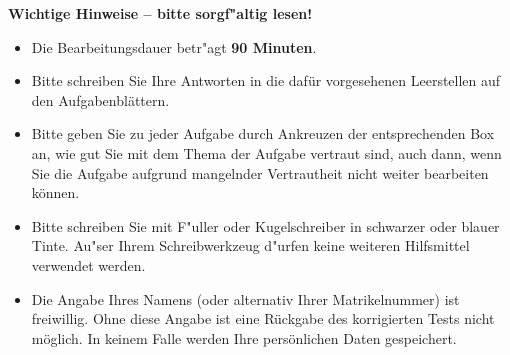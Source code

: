 \documentclass[12pt]{exam}
\begin{document}
\begin{center} \textbf{Wichtige Hinweise -- bitte sorgf"altig lesen!} \end{center}
\begin{itemize}
\item Die Bearbeitungsdauer betr"agt \textbf{90 Minuten}.

\item Bitte schreiben Sie Ihre Antworten in die daf\"ur vorgesehenen
Leerstellen auf den Aufgabenbl\"attern.

\item Bitte geben Sie zu jeder Aufgabe durch Ankreuzen der entsprechenden
Box an, wie gut Sie mit dem Thema der Aufgabe vertraut sind, auch dann,
wenn Sie die Aufgabe aufgrund mangelnder Vertrautheit nicht weiter
bearbeiten können.

\item Bitte schreiben Sie mit F"uller oder Kugelschreiber in schwarzer oder
blauer Tinte. Au"ser Ihrem Schreibwerkzeug 
d"urfen keine weiteren Hilfsmittel verwendet werden.

\item Die Angabe Ihres Namens (oder alternativ Ihrer Matrikelnummer) ist
freiwillig. Ohne diese Angabe ist eine Rückgabe des korrigierten Tests
nicht möglich. In keinem Falle werden Ihre persönlichen Daten gespeichert.

\end{itemize}

\clearpage
\end{document}
